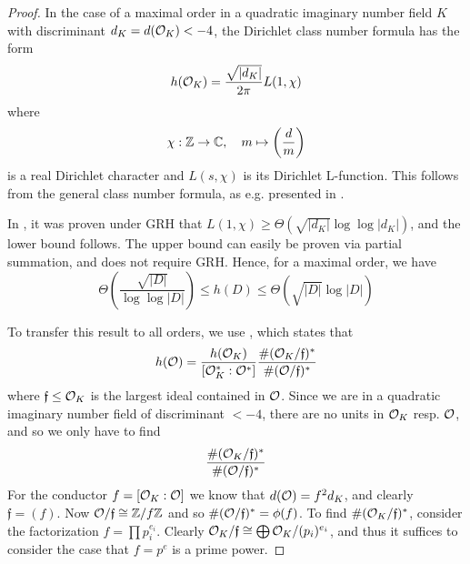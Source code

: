 \begin{proof}
    In the case of a maximal order in a quadratic imaginary number field $K$ with discriminant $d_K = d(\mathcal{O}_K) < -4$, the Dirichlet class number formula has the form
    \begin{equation*}
        h(\mathcal{O}_K) = \frac {\sqrt{|d_K|}} {2\pi} L(1, \chi)
    \end{equation*}
    where
    \begin{equation*}
        \chi: \mathbb{Z} \to \mathbb{C}, \quad m \mapsto \left(\frac d m\right)
    \end{equation*}
    is a real Dirichlet character and $L(s, \chi)$ is its Dirichlet L-function.
    This follows from the general class number formula, as e.g. presented in \cite[Korollar~VII.5.11]{neukirch}.

    In \cite[Thm~1]{class_number_lower_bound}, it was proven under GRH that $L(1, \chi) \geq \Theta(\sqrt{|d_K|}\log\log|d_K|)$, and the lower bound follows.
    The upper bound can easily be proven via partial summation, and does not require GRH.
    Hence, for a maximal order, we have
    \begin{equation*}
        \Theta\left(\frac {\sqrt{|D|}} {\log\log|D|}\right) \leq h(D) \leq \Theta\left(\sqrt{|D|} \log|D|\right)
    \end{equation*}

    To transfer this result to all orders, we use \cite[Thm~I.12.12]{neukirch}, which states that
    \begin{equation*}
        h(\mathcal{O}) = \frac {h(\mathcal{O}_K)} {[\mathcal{O}_K^* : \mathcal{O}^*]} \frac {\#(\mathcal{O}_K / \mathfrak{f})^*} {\#(\mathcal{O} / \mathfrak{f})^*}
    \end{equation*}
    where $\mathfrak{f} \leq \mathcal{O}_K$ is the largest ideal contained in $\mathcal{O}$.
    Since we are in a quadratic imaginary number field of discriminant $< -4$, there are no units in $\mathcal{O}_K$ resp. $\mathcal{O}$, and so we only have to find
    \begin{equation*}
        \frac {\#(\mathcal{O}_K / \mathfrak{f})^*} {\#(\mathcal{O} / \mathfrak{f})^*}
    \end{equation*}
    For the conductor $f = [\mathcal{O}_K : \mathcal{O}]$ we know that $d(\mathcal{O}) = f^2 d_K$, and clearly $\mathfrak{f} = (f)$.
    Now $\mathcal{O}/\mathfrak{f} \cong \mathbb{Z}/f\mathbb{Z}$ and so $\#(\mathcal{O}/\mathfrak{f})^* = \phi(f)$.
    To find $\#(\mathcal{O}_K/\mathfrak{f})^*$, consider the factorization $f = \prod p_i^{e_i}$.
    Clearly $\mathcal{O}_K/\mathfrak{f} \cong \bigoplus \mathcal{O}_K/(p_i)^{e_i}$, and thus it suffices to consider the case that $f = p^e$ is a prime power.


\end{proof}
